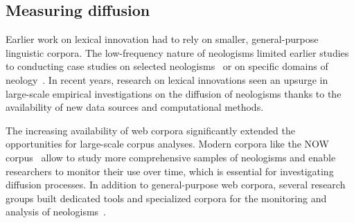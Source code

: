 \documentclass[
  a4paper,
  abstract=on,
  captions=tableabove,
  ]{scrartcl}
\begin{document}


  \subsection{Measuring diffusion}
  
    Earlier work on lexical innovation had to rely on smaller, general-purpose linguistic corpora. The low-frequency nature of neologisms limited earlier studies to conducting case studies on selected neologisms~\parencite{Hohenhaus2006BouncebackabilityWebascorpusbased} or on specific domains of neology~\parencite{Elsen2004NeologismenFormen}. In recent years, research on lexical innovations seen an upsurge in large-scale empirical investigations on the diffusion of neologisms thanks to the availability of new data sources and computational methods.

      The increasing availability of web corpora significantly extended the opportunities for large-scale corpus analyses. Modern corpora like the NOW corpus~\parencite{Davies2013CorpusNews} allow to study more comprehensive samples of neologisms and enable researchers to monitor their use over time, which is essential for investigating diffusion processes. In addition to general-purpose web corpora, several research groups built dedicated tools and specialized corpora for the monitoring and analysis of neologisms~\parencite{Renouf2006WebCorpIntegrated, Kerremans2012NeoCrawlerIdentifying,LemnitzerWortwarte,Gerard2017LogoscopeObservatoire,Cartier2017NeoveilleWeb}.
\end{document}
